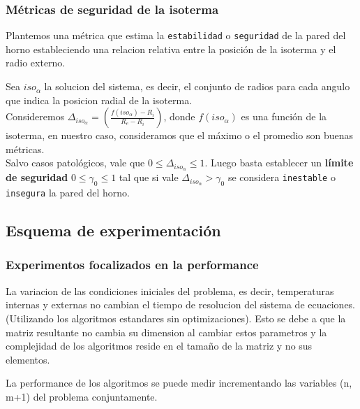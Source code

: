\subsubsection{Métricas de seguridad de la isoterma}
Plantemos una métrica que estima la \texttt{estabilidad} o \texttt{seguridad} de la pared del horno estableciendo una relacion relativa entre la posición de la isoterma y el radio externo. 
\begin{algoritmo} Sea $iso_\alpha$ la solucion del sistema, es decir, el conjunto de radios para cada angulo que indica la posicion radial de la isoterma.\\
    Consideremos $\Delta_{iso_\alpha} = \left( \frac{f(iso_\alpha) - R_i}{R_e - R_i} \right)$, donde $f(iso_\alpha)$ es una función de la isoterma, en nuestro caso, consideramos que el máximo o el promedio son buenas métricas.\\
    Salvo casos patológicos, vale que $0 \leq \Delta_{iso_\alpha}\leq 1$. Luego basta establecer un \textbf{límite de seguridad} $0 \leq \gamma_0 \leq 1$ tal que si vale $\Delta_{iso_\alpha} > \gamma_0$ se considera \texttt{inestable} o \texttt{insegura} la pared del horno.
\end{algoritmo}

\subsection{Esquema de experimentación}
\subsubsection{Experimentos focalizados en la performance}

\begin{hipotesis} La variacion de las condiciones iniciales del problema, es decir, temperaturas internas y externas no cambian el tiempo de resolucion del sistema de ecuaciones.(Utilizando los algoritmos estandares sin optimizaciones). Esto se debe a que la matriz resultante no cambia su dimension al cambiar estos parametros y la complejidad de los algoritmos reside en el tamaño de la matriz y no sus elementos.
\end{hipotesis}

\begin{proposition} La performance de los algoritmos se puede medir incrementando las variables (n, m+1) del problema conjuntamente.
\end{proposition}

